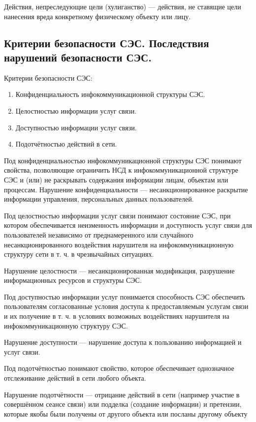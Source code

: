 \documentclass[12pt, russian, oneside, article]{ncc}
\begin{document}
Действия, непреследующие цели (хулиганство) --- действия, не ставящие цели нанесения вреда конкретному физическому объекту или лицу.
\subsection{Критерии безопасности СЭС. Последствия нарушений безопасности СЭС.}
\label{sec-1_3}


Критерии безопасности СЭС:
\begin{enumerate}
\item Конфиденциальность инфокоммуникационной структуры СЭС.
\item Целостностью информации услуг связи.
\item Доступностью информации услуг связи.
\item Подотчётностью действий в сети.
\end{enumerate}

Под конфиденциальностью инфокоммуникационной структуры СЭС понимают свойства, позволяющие ограничить НСД к инфокоммуникационной структуре СЭС и (или) не раскрывать содержания информации лицам, объектам или процессам. Нарушение конфиденциальности --- несанкционированное раскрытие информации управления, персональных данных пользователей.

Под целостностью информации услуг связи понимают состояние СЭС, при котором обеспечивается неизменность информации и доступность услуг связи для пользователей независимо от преднамеренного или случайного несанкционированного воздействия нарушителя на инфокоммуникационную структуру сети в т. ч. в чрезвычайных ситуациях.

Нарушение целостности --- несанкционированная модификация, разрушение информационных ресурсов и структуры СЭС.

Под доступностью информации услуг понимается способность СЭС обеспечить пользователям согласованные условия доступа к предоставляемым услугам связи и их получение в т. ч. в условиях возможных воздействиях нарушителя на инфокоммуникационную структуру СЭС.

Нарушение доступности --- нарушение доступа к пользованию информацией и услуг связи.

Под подотчётностью понимают свойство, которое обеспечивает однозначное отслеживание действий в сети любого объекта.

Нарушение подотчётности --- отрицание действий в сети (например участие в совершённом сеансе связи) или подделка (создание информации) и претензии, которые якобы были получены от другого объекта или посланы другому объекту
\end{document}
